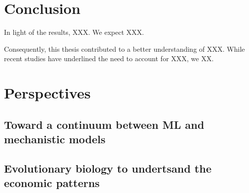 \section{Conclusion}
In light of the results, XXX.
% 
We expect XXX.

Consequently, this thesis contributed to a better understanding of XXX.
% 
While recent studies have underlined the need to account for XXX, we XX.

\section{Perspectives}

\subsection{Toward a continuum between ML and mechanistic models}

\subsection{Evolutionary biology to undertsand the economic patterns}